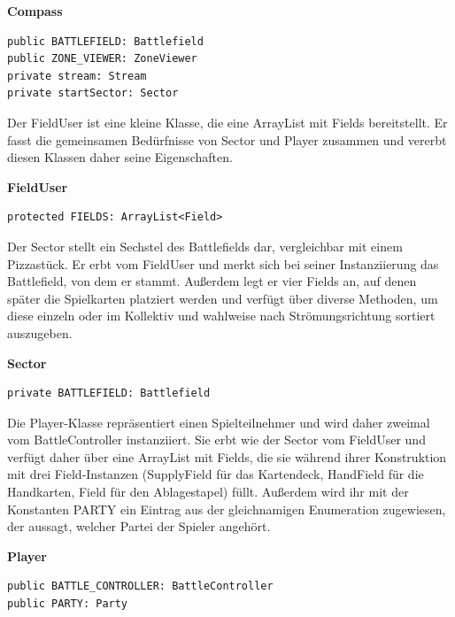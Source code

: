 \textbf{Compass}
\begin{lstlisting}[frame=single]
public BATTLEFIELD: Battlefield
public ZONE_VIEWER: ZoneViewer
private stream: Stream
private startSector: Sector
\end{lstlisting}

Der FieldUser ist eine kleine Klasse, die eine ArrayList mit Fields bereitstellt. Er fasst die gemeinsamen Bedürfnisse von Sector und Player zusammen und vererbt diesen Klassen daher seine Eigenschaften.

\textbf{FieldUser}
\begin{lstlisting}[frame=single]
protected FIELDS: ArrayList<Field>
\end{lstlisting}

Der Sector stellt ein Sechstel des Battlefields dar, vergleichbar mit einem Pizzastück. Er erbt vom FieldUser und merkt sich bei seiner Instanziierung das Battlefield, von dem er stammt. Außerdem legt er vier Fields an, auf denen später die Spielkarten platziert werden und verfügt über diverse Methoden, um diese einzeln oder im Kollektiv und wahlweise nach Strömungsrichtung sortiert auszugeben.

\textbf{Sector}
\begin{lstlisting}[frame=single]
private BATTLEFIELD: Battlefield
\end{lstlisting}

Die Player-Klasse repräsentiert einen Spielteilnehmer und wird daher zweimal vom BattleController instanziiert. Sie erbt wie der Sector vom FieldUser und verfügt daher über eine ArrayList mit Fields, die sie während ihrer Konstruktion mit drei Field-Instanzen (SupplyField für das Kartendeck, HandField für die Handkarten, Field für den Ablagestapel) füllt. Außerdem wird ihr   mit der Konstanten PARTY ein Eintrag aus der gleichnamigen Enumeration zugewiesen, der aussagt, welcher Partei der Spieler angehört.

\textbf{Player}
\begin{lstlisting}[frame=single]
public BATTLE_CONTROLLER: BattleController
public PARTY: Party
\end{lstlisting}

